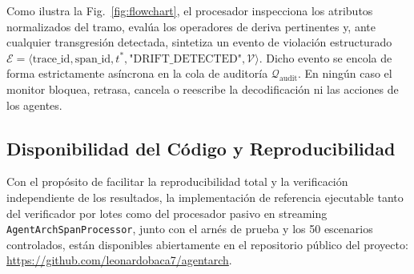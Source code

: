 \documentclass[conference]{IEEEtran}
\begin{document}
Como ilustra la Fig.~\ref{fig:flowchart}, el procesador inspecciona los atributos normalizados del tramo, eval\'ua los operadores de deriva pertinentes y, ante cualquier transgresi\'on detectada, sintetiza un evento de violaci\'on estructurado $\mathcal{E} = \langle \text{trace\_id}, \text{span\_id}, t^*, \text{"DRIFT\_DETECTED"}, \mathcal{V} \rangle$. Dicho evento se encola de forma estrictamente as\'incrona en la cola de auditor\'ia $\mathcal{Q}_{\text{audit}}$. En ning\'un caso el monitor bloquea, retrasa, cancela o reescribe la decodificaci\'on ni las acciones de los agentes.

\subsection{Disponibilidad del C\'odigo y Reproducibilidad}
Con el prop\'osito de facilitar la reproducibilidad total y la verificaci\'on independiente de los resultados, la implementaci\'on de referencia ejecutable tanto del verificador por lotes como del procesador pasivo en streaming \texttt{AgentArchSpanProcessor}, junto con el arn\'es de prueba y los 50 escenarios controlados, est\'an disponibles abiertamente en el repositorio p\'ublico del proyecto: \url{https://github.com/leonardobaca7/agentarch}.
\end{document}
